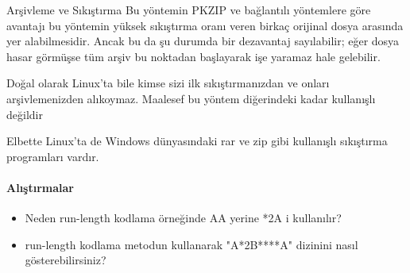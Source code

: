\begin{section}{Arşivleme ve Sıkıştırma}
Bu yöntemin PKZIP ve bağlantılı yöntemlere göre avantajı bu yöntemin yüksek sıkıştırma oranı veren birkaç orijinal dosya arasında yer alabilmesidir. Ancak bu da şu durumda bir dezavantaj sayılabilir; eğer dosya hasar görmüşse tüm arşiv bu noktadan başlayarak işe yaramaz hale gelebilir.

Doğal olarak Linux’ta bile kimse sizi ilk sıkıştırmanızdan ve onları arşivlemenizden alıkoymaz. Maalesef bu yöntem diğerindeki kadar kullanışlı değildir

Elbette Linux’ta de Windows dünyasındaki rar ve zip gibi kullanışlı sıkıştırma programları vardır.
\paragraph{Alıştırmalar}{
\begin{itemize}
 \item Neden run-length kodlama örneğinde AA yerine *2A i kullanılır?
 \item run-length kodlama metodun kullanarak "A*2B****A" dizinini
nasıl gösterebilirsiniz?
\end{itemize}}
\end{section}

